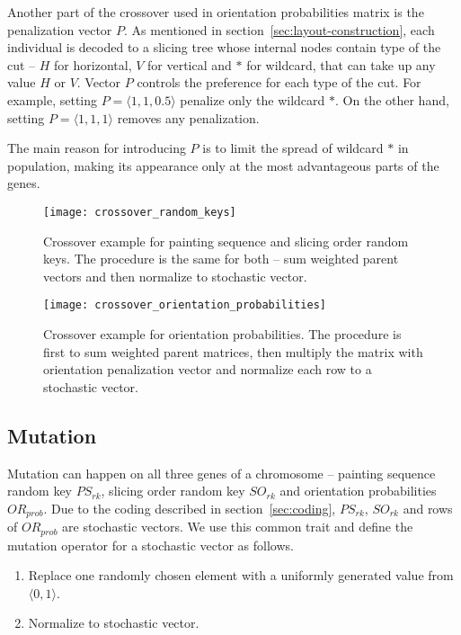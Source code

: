 Another part of the crossover used in orientation probabilities matrix is the penalization vector $P$.
As mentioned in section~\ref{sec:layout-construction}, each individual is decoded to a slicing tree
whose internal nodes contain type of the cut – $H$ for horizontal, $V$ for vertical
and $*$ for wildcard, that can take up any value $H$ or $V$.
Vector $P$ controls the preference for each type of the cut.
For example, setting $P= \langle 1,1,0.5 \rangle$ penalize only the wildcard $*$.
On the other hand, setting $P= \langle 1,1,1 \rangle$ removes any penalization.

The main reason for introducing $P$ is to limit the spread of wildcard $*$ in population,
making its appearance only at the most advantageous parts of the genes.

\begin{figure}[htp]
    \texttt{[image: crossover\_random\_keys]}\caption{
        Crossover example for painting sequence and slicing order random keys.
        The procedure is the same for both – sum weighted parent vectors and then normalize to stochastic vector.
    }
    \label{fig:crossover-random-keys}
\end{figure}

\begin{figure}[htp]
    \texttt{[image: crossover\_orientation\_probabilities]}\caption{
        Crossover example for orientation probabilities. The procedure is first to sum weighted parent matrices,
        then multiply the matrix with orientation penalization vector and normalize each row to a stochastic vector.}
    \label{fig:crossover-orientation-probabilities}
\end{figure}

\subsection{Mutation}\label{subsec:mutation}

Mutation can happen on all three genes of a chromosome – painting sequence random key $PS_{rk}$,
slicing order random key $SO_{rk}$ and orientation probabilities $OR_{prob}$.
Due to the coding described in section~\ref{sec:coding}, $PS_{rk}$, $SO_{rk}$ and rows of $OR_{prob}$ are stochastic vectors.
We use this common trait and define the mutation operator for a stochastic vector as follows.

\begin{enumerate}
    \item Replace one randomly chosen element with a uniformly generated value from $\langle 0,1 \rangle$.
    \item Normalize to stochastic vector.
\end{enumerate}

